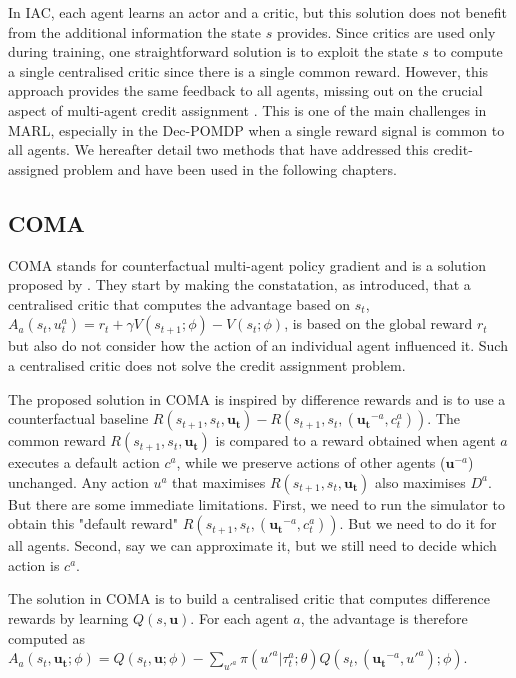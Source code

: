 In IAC, each agent learns an actor and a critic, but this solution does not benefit from the additional information the state $s$ provides.
Since critics are used only during training, one straightforward solution is to exploit the state $s$ to compute a single centralised critic since there is a single common reward.
However, this approach provides the same feedback to all agents, missing out on the crucial aspect of multi-agent credit assignment \citep{chang2003all}.
This is one of the main challenges in MARL, especially in the Dec-POMDP when a single reward signal is common to all agents.
We hereafter detail two methods that have addressed this credit-assigned problem and have been used in the following chapters.

\subsection{COMA}
COMA stands for counterfactual multi-agent policy gradient and is a solution proposed by \cite{Foerster2017coma}.
They start by making the constatation, as introduced, that a centralised critic that computes the advantage based on $s_t$, $A_a(s_t, u^a_t) = r_t + \gamma V(s_{t+1}; \phi) - V(s_t; \phi)$, is based on the global reward $r_t$ but also do not consider how the action of an individual agent influenced it.
Such a centralised critic does not solve the credit assignment problem. 

The proposed solution in COMA is inspired by difference rewards \citep{wolpert2001optimal} and is to use a counterfactual baseline $R(s_{t+1}, s_t, \boldsymbol {u_t}) - R(s_{t+1}, s_t, (\boldsymbol{u_t}^{-a}, c_t^a))$.
The common reward $R(s_{t+1}, s_t, \boldsymbol {u_t})$ is compared to a reward obtained when agent $a$ executes a default action $c^a$, while we preserve actions of other agents ($\mathbf{u}^{-a}$) unchanged.
Any action $u^a$ that maximises $R(s_{t+1}, s_t, \boldsymbol {u_t})$ also maximises $D^a$.
But there are some immediate limitations.
First, we need to run the simulator to obtain this "default reward" $R(s_{t+1}, s_t, (\boldsymbol{u_t}^{-a}, c_t^a))$.
But we need to do it for all agents.
Second, say we can approximate it, but we still need to decide which action is $c^a$.

The solution in COMA is to build a centralised critic that computes difference rewards by learning $Q(s, \mathbf{u})$.
For each agent $a$, the advantage is therefore computed as $A_a(s_t,\boldsymbol{u_t}; \phi)=Q(s_t, \boldsymbol{u};\phi) - \sum_{u'^{a}} \pi({u'^{a}} |\tau_t^a;\theta) Q(s_t, (\boldsymbol{u_t}^{-a}, u'^{a}); \phi)$.

